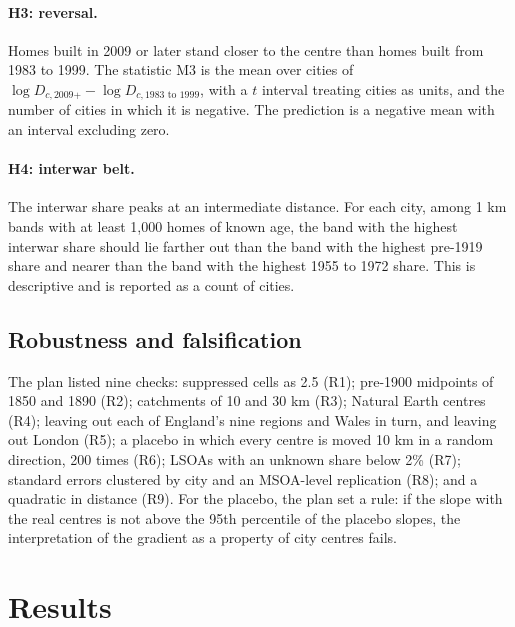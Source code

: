 \paragraph{H3: reversal.} Homes built in 2009 or later stand closer to the centre than homes built from 1983 to 1999. The statistic M3 is the mean over cities of $\log D_{c,\text{2009+}}-\log D_{c,\text{1983 to 1999}}$, with a $t$ interval treating cities as units, and the number of cities in which it is negative. The prediction is a negative mean with an interval excluding zero.

\paragraph{H4: interwar belt.} The interwar share peaks at an intermediate distance. For each city, among 1 km bands with at least 1,000 homes of known age, the band with the highest interwar share should lie farther out than the band with the highest pre-1919 share and nearer than the band with the highest 1955 to 1972 share. This is descriptive and is reported as a count of cities.

\subsection{Robustness and falsification}
The plan listed nine checks: suppressed cells as 2.5 (R1); pre-1900 midpoints of 1850 and 1890 (R2); catchments of 10 and 30 km (R3); Natural Earth centres (R4); leaving out each of England's nine regions and Wales in turn, and leaving out London (R5); a placebo in which every centre is moved 10 km in a random direction, 200 times (R6); LSOAs with an unknown share below 2\% (R7); standard errors clustered by city and an MSOA-level replication (R8); and a quadratic in distance (R9). For the placebo, the plan set a rule: if the slope with the real centres is not above the 95th percentile of the placebo slopes, the interpretation of the gradient as a property of city centres fails.

\section{Results}
\label{sec:results}
